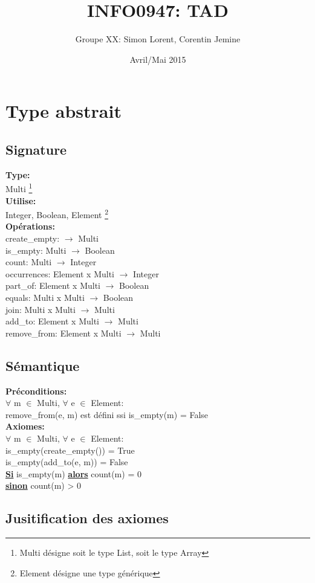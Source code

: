 \documentclass[a4paper, 11pt, oneside]{article}
\begin{document}

\title{INFO0947: TAD}
\author{Groupe XX: Simon Lorent, Corentin Jemine}
\date{Avril/Mai 2015}

\maketitle
\clearpage

\section{Type abstrait}
	\subsection{Signature}
	\noindent \textbf{Type:}
	\\ \indent Multi \footnote{Multi désigne soit le type List, soit le type Array}
	\\ \textbf{Utilise:}
	\\ \indent Integer, Boolean, Element \footnote{Element désigne une type générique}
	\\ \textbf{Opérations:}
	\\ \indent create\_empty: $\rightarrow$ Multi
	\\ \indent is\_empty: Multi $\rightarrow$ Boolean
	\\ \indent count: Multi $\rightarrow$ Integer
	\\ \indent occurrences: Element x Multi $\rightarrow$ Integer
	\\ \indent part\_of: Element x Multi $\rightarrow$ Boolean
	\\ \indent equals: Multi x Multi $\rightarrow$ Boolean
	\\ \indent join: Multi x Multi $\rightarrow$ Multi
	\\ \indent add\_to: Element x Multi $\rightarrow$ Multi
	\\ \indent remove\_from: Element x Multi $\rightarrow$ Multi
	\subsection{Sémantique}
	\noindent \textbf{Préconditions:}
	\\ \indent $\forall$ m $\in$ Multi, $\forall$ e $\in$ Element:
	\\ \indent \indent remove\_from(e, m) est défini ssi is\_empty(m) = False
	\\ \textbf{Axiomes:}
	\\ \indent $\forall$ m $\in$ Multi, $\forall$ e $\in$ Element:
	\\ \indent \indent is\_empty(create\_empty()) = True
	\\ \indent \indent is\_empty(add\_to(e, m)) = False
	\\ \indent \indent \underline{\textbf{Si}} is\_empty(m) \underline{\textbf{alors}} count(m) = 0
	\\ \indent \indent \underline{\textbf{sinon}} count(m) > 0
	
	\subsection{Jusitification des axiomes}
\end{document}
